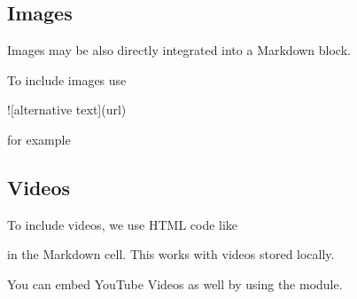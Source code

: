 \documentclass[letterpaper,10pt,english]{sphinxmanual}
\let\sphinxpxdimen\pdfpxdimen\else\newdimen\sphinxpxdimen
\begin{document}
\subsection{Images}
\label{\detokenize{notebooks/Intro/EditCells:Images}}
Images may be also directly integrated into a Markdown block.

To include images use

\begin{sphinxVerbatim}[commandchars=\\\{\}]
![alternative text](url)
\end{sphinxVerbatim}

for example

\sphinxincludegraphics[width=200\sphinxpxdimen,height=200\sphinxpxdimen]{{particle}.png}


\subsection{Videos}
\label{\detokenize{notebooks/Intro/EditCells:Videos}}
To include videos, we use HTML code like

\begin{sphinxVerbatim}[commandchars=\\\{\}]
     
\end{sphinxVerbatim}

in the Markdown cell. This works with videos stored locally.





You can embed YouTube Videos as well by using the  module.

{
\begin{sphinxVerbatim}[commandchars=\\\{\}]
\llap{\color{nbsphinxin}[9]:\,\hspace{\fboxrule}\hspace{\fboxsep}}   
\end{sphinxVerbatim}
}
\end{document}
